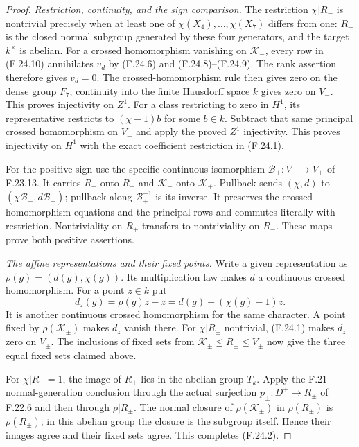 \begin{proof}
\emph{Restriction, continuity, and the sign comparison.}
The restriction $\chi|R_-$ is nontrivial precisely when
at least one of $\chi(X_4),\ldots,\chi(X_7)$ differs
from one: $R_-$ is the closed normal subgroup generated
by these four generators, and the target $k^\times$
is abelian. For a crossed homomorphism vanishing on
$\mathcal K_-$, every row in (F.24.10) annihilates $v_d$
by (F.24.6) and (F.24.8)--(F.24.9). The rank assertion
therefore gives $v_d=0$. The crossed-homomorphism rule
then gives zero on the dense group $F_7$; continuity
into the finite Hausdorff space $k$ gives zero on
$V_-$. This proves injectivity on $Z^1$.
For a class restricting to zero in $H^1$, its
representative restricts to $(\chi-1)b$ for some $b\in k$.
Subtract that same principal crossed homomorphism on
$V_-$ and apply the proved $Z^1$ injectivity. This
proves injectivity on $H^1$ with the exact coefficient
restriction in (F.24.1).

For the positive sign use the specific continuous
isomorphism $\mathcal B_+:V_-\to V_+$ of F.23.13.
It carries $R_-$ onto $R_+$ and $\mathcal K_-$ onto
$\mathcal K_+$. Pullback sends $(\chi,d)$ to
$(\chi\mathcal B_+,d\mathcal B_+)$; pullback along
$\mathcal B_+^{-1}$ is its inverse. It preserves the
crossed-homomorphism equations and the principal
rows and commutes literally with restriction.
Nontriviality on $R_+$ transfers to nontriviality on
$R_-$. These maps prove both positive assertions.

\emph{The affine representations and their fixed points.}
Write a given representation as
$\rho(g)=(d(g),\chi(g))$. Its multiplication law makes
$d$ a continuous crossed homomorphism. For a point
$z\in k$ put
\[
       d_z(g)=\rho(g)z-z=d(g)+(\chi(g)-1)z .                  \tag{F.24.15}
\]
It is another continuous crossed homomorphism for
the same character. A point fixed by
$\rho(\mathcal K_\pm)$ makes $d_z$ vanish there.
For $\chi|R_\pm$ nontrivial, (F.24.1) makes $d_z$
zero on $V_\pm$. The inclusions of fixed sets from
$\mathcal K_\pm\leq R_\pm\leq V_\pm$ now give the
three equal fixed sets claimed above.

For $\chi|R_\pm=1$, the image of $R_\pm$ lies in
the abelian group $T_k$. Apply the F.21 normal-generation
conclusion through the actual surjection
$p_\pm:D^+\to R_\pm$ of F.22.6 and then through
$\rho|R_\pm$. The normal closure of
$\rho(\mathcal K_\pm)$ in $\rho(R_\pm)$ is
$\rho(R_\pm)$; in this abelian group the closure is
the subgroup itself. Hence their images agree and
their fixed sets agree. This completes (F.24.2).


\end{proof}
